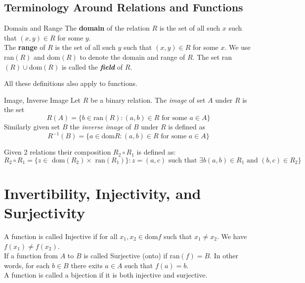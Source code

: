 \documentclass[16pt,a4paper]{article}
\theoremstyle{definition}
\begin{document}
\subsection{Terminology Around Relations and Functions}
\begin{defn}{Domain and Range}{}
The \textbf{domain} of the relation $R$ is the set of all such $x$ such that $(x,y)\in R$ for some $y$. \\
The \textbf{range} of $R$ is the set of all such $y$ such that $(x,y)\in R$ for some $x$. 
We use ran$(R)$ and dom$(R)$ to denote the domain and range of $R$. 
The set ran$(R)\cup$dom$(R)$ is called the \textbf{\textit{\emph{field}}} of $R$.  
\end{defn}
All these definitions also apply to functions. 
\begin{defn}{Image, Inverse Image}{}
Let $R$ be a binary relation. The \textit{image} of set $A$ under $R$ is the set
\[R(A) = \{b\in \text{ran}(R) : (a,b) \in R \text{ for some } a\in A\}\]
Similarly given set $B$ the \textit{inverse image} of $B$ under $R$ is defined as
\[R^{-1} (B) = \{a\in \text{dom$R$} : (a,b)\in R \text{ for some $a\in A$}\}\]
\end{defn}
Given 2 relations their composition $R_2\circ R_1$ is defined as:
\[R_2 \circ R_1 = \{z\in \text{ dom$(R_2)\times$ ran$(R_1)$}\} : z = (a,c) \text{ such that $\exists b (a,b) \in R_1$ and $(b,c)\in R_2$}\}\]

\section{Invertibility, Injectivity, and Surjectivity}
A function is called Injective if for all $x_1, x_2 \in $dom$f$ such that $x_1 \neq x_2$. We have $f(x_1) \neq f(x_2)$. \\

If a function from $A$ to $B$ is called Surjective (onto) if ran$(f) = B$. In other words, for each $b\in B$ there exits $a\in A$ such that $f(a) = b$. \\

A function is called a bijection if it is both injective and surjective. 
\end{document}
